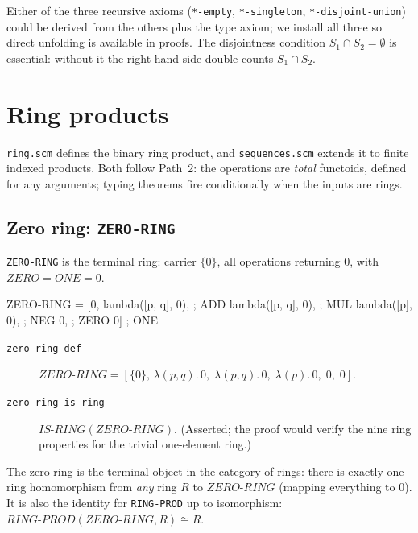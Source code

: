\begin{remark}
Either of the three recursive axioms (\texttt{*-empty},
\texttt{*-singleton}, \texttt{*-disjoint-union}) could be derived from
the others plus the type axiom; we install all three so direct
unfolding is available in proofs.  The disjointness condition
$S_1 \cap S_2 = \emptyset$ is essential: without it the right-hand side
double-counts $S_1 \cap S_2$.
\end{remark}

\section{Ring products}
\label{sec:ring-prod}

\texttt{ring.scm} defines the binary ring product, and
\texttt{sequences.scm} extends it to finite indexed products.
Both follow Path~2: the operations are \emph{total} functoids, defined
for any arguments; typing theorems fire conditionally when the inputs
are rings.

\subsection{Zero ring: \texttt{ZERO-RING}}

\texttt{ZERO-RING} is the terminal ring: carrier $\{0\}$, all operations
returning $0$, with $\mathit{ZERO} = \mathit{ONE} = 0$.

\begin{VNBsnip}
ZERO-RING = [{0},
             lambda([p, q], 0),   ; ADD
             lambda([p, q], 0),   ; MUL
             lambda([p], 0),      ; NEG
             0,                   ; ZERO
             0]                   ; ONE
\end{VNBsnip}

\begin{description}
\item[\texttt{zero-ring-def}]
  $\mathit{ZERO\text{-}RING} = [\{0\},\,
   \lambda(p,q).\,0,\; \lambda(p,q).\,0,\; \lambda(p).\,0,\; 0,\; 0]$.
\item[\texttt{zero-ring-is-ring}]
  $\mathit{IS\text{-}RING}(\mathit{ZERO\text{-}RING})$.
  (Asserted; the proof would verify the nine ring properties for
  the trivial one-element ring.)
\end{description}

\begin{remark}
The zero ring is the terminal object in the category of rings: there is
exactly one ring homomorphism from \emph{any} ring $R$ to
$\mathit{ZERO\text{-}RING}$ (mapping everything to $0$).  It is also
the identity for \texttt{RING-PROD} up to isomorphism:
$\mathit{RING\text{-}PROD}(\mathit{ZERO\text{-}RING}, R) \cong R$.
\end{remark}

